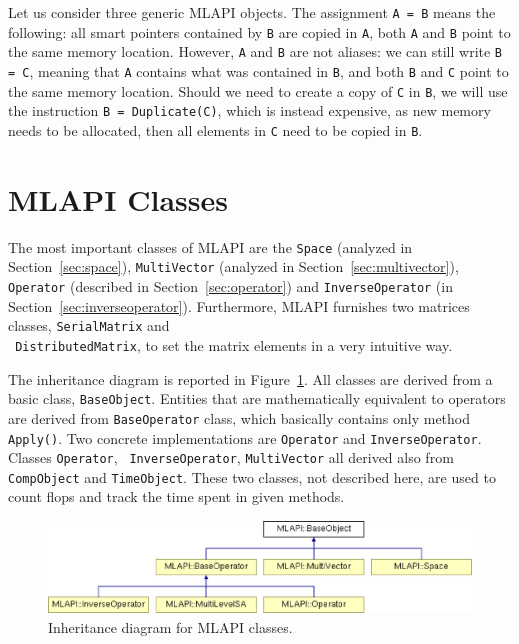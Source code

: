 \documentclass{article}[11pt]
\newcommand{\MLAPI}  {{\sc MLAPI }}
\begin{document}
\noindent
Let us consider three generic \MLAPI objects.
The assignment \verb!A = B! means the following: all smart pointers contained
by \verb!B! are copied in \verb!A!, both \verb!A! and \verb!B! point to the
same memory location. However, \verb!A! and \verb!B! are not aliases: we can
still write \verb!B = C!, meaning that \verb!A! contains what was contained in
\verb!B!, and both \verb!B! and \verb!C! point to the same memory location. 
Should we need to create a copy of \verb!C! in \verb!B!, we will use the
instruction \verb!B = Duplicate(C)!, which is instead expensive, as new memory
needs to be allocated, then all elements in \verb!C! need to be copied in
\verb!B!.

\section{\MLAPI Classes}
\label{sec:basic}

The most important classes of \MLAPI are the {\tt Space} 
(analyzed in Section~\ref{sec:space}), {\tt MultiVector}
(analyzed in Section~\ref{sec:multivector}),
{\tt Operator} (described in Section~\ref{sec:operator}) and 
{\tt InverseOperator} (in Section~\ref{sec:inverseoperator}). Furthermore,
\MLAPI furnishes two matrices classes, {\tt SerialMatrix} and \\
{\tt
  DistributedMatrix}, to set the matrix elements in a very intuitive 
  way.

The inheritance diagram is reported in Figure~\ref{fig:in}. All classes are
derived from a basic class, {\tt BaseObject}. Entities that are mathematically
equivalent to operators are derived from {\tt BaseOperator} class, which
basically contains only method {\tt Apply()}. Two concrete implementations are
{\tt Operator} and {\tt InverseOperator}.  Classes {\tt Operator}, {\tt
  InverseOperator}, {\tt MultiVector} all derived also from {\tt CompObject}
  and {\tt TimeObject}. These two classes, not  described here, are used to
  count flops and track the time spent in given methods. 

\begin{figure}
\begin{center}
\includegraphics[width=12cm]{MLAPI_classes.eps}
\caption{Inheritance diagram for \MLAPI classes.}
\label{fig:in}
\end{center}
\end{figure}
\end{document}
